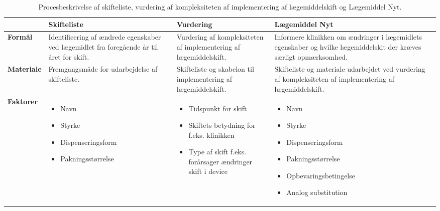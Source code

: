 \begin{table}[H]
\caption{Procesbeskrivelse af skifteliste, vurdering af kompleksiteten af implementering af lægemiddelskift og Lægemiddel Nyt.}
\vspace{2mm}
\label{table:Proces}
\centering
\begin{tabular}{p{1.8cm}|p{3.5cm}|p{3.5cm}|p{4.2cm}}
\cellcolor[HTML]{C0C0C0}\textbf{} & \cellcolor[HTML]{C0C0C0}\textbf{Skifteliste} & \cellcolor[HTML]{C0C0C0}\textbf{Vurdering} & \cellcolor[HTML]{C0C0C0}\textbf{Lægemiddel Nyt}\\ \hline
\cellcolor[HTML]{C0C0C0}\textbf{Formål} & Identificering af ændrede egenskaber ved lægemidlet fra foregående år til året for skift. & Vurdering af kompleksiteten af implementering af lægemiddelskift. & Informere klinikken om ændringer i lægemidlets egenskaber og hvilke lægemiddelskit der kræves særligt opmærksomhed. \\ \hline
\cellcolor[HTML]{C0C0C0}\textbf{Materiale} & Fremgangsmåde for udarbejdelse af skifteliste. & Skifteliste  og skabelon til implementering af lægemiddelskift. & Skifteliste og materiale udarbejdet ved vurdering af kompleksiteten af implementering af lægemiddelskift. \\ \hline
\cellcolor[HTML]{C0C0C0}\textbf{Faktorer} & \vspace{-0.2cm}\begin{itemize}[topsep=-0.5cm,leftmargin=0.3cm] \item Navn \item Styrke\item Dispenseringsform \item Pakningsstørrelse \end{itemize} & \vspace{-0.2cm}\begin{itemize}[topsep=-0.5cm,leftmargin=0.3cm] \item Tidspunkt for skift\item Skiftets betydning for f.eks. klinikken \item Type af skift f.eks. forårsager ændringer skift i device \end{itemize}  & \vspace{-0.2cm}\begin{itemize}[topsep=-0.5cm,leftmargin=0.3cm] \item Navn \item Styrke \item Dispenseringsform \item Pakningsstørrelse \item Opbevaringsbetingelse \item Analog substitution  \end{itemize}    
\end{tabular}
\end{table}

